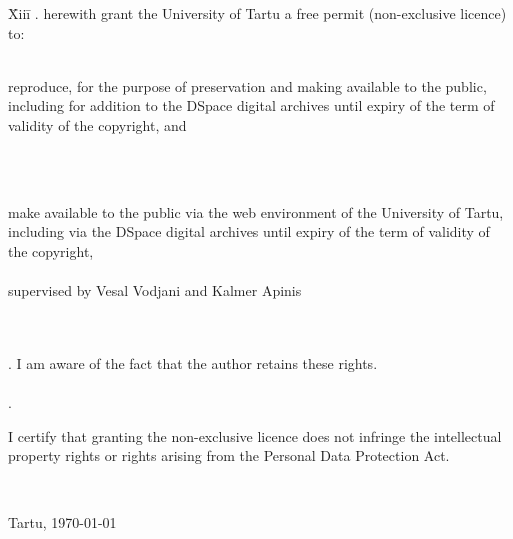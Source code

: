 \documentclass{style/master-thesis}
\begin{document}
\begin{tabbing}
\= Xiii\=\kill
{}. \> herewith grant the University of Tartu a free permit (non-exclusive licence) to:\\\\ 

\> 
\begin{minipage}[t]{14.2cm}
reproduce, for the purpose of preservation and making available to the public, including for addition to the DSpace digital archives until expiry of the term of validity of the copyright, and
\end{minipage}
\\\\
\begin{minipage}[t]{14.2cm}
make available to the public via the web environment of the University of Tartu, including via the DSpace digital archives until expiry of the term of validity of the copyright,\\ 

\articleName\\   

supervised by Vesal Vodjani and Kalmer Apinis

\end{minipage}\\\\ 
. \>I am aware of the fact that the author retains these rights.\\\\
. \>
\begin{minipage}[t]{14.2cm}
I certify that granting the non-exclusive licence does not infringe the intellectual property rights or rights arising from the Personal Data Protection Act. 
\end{minipage}\\
\end{tabbing}

\noindent
Tartu, \today

\newpage
\end{document}
